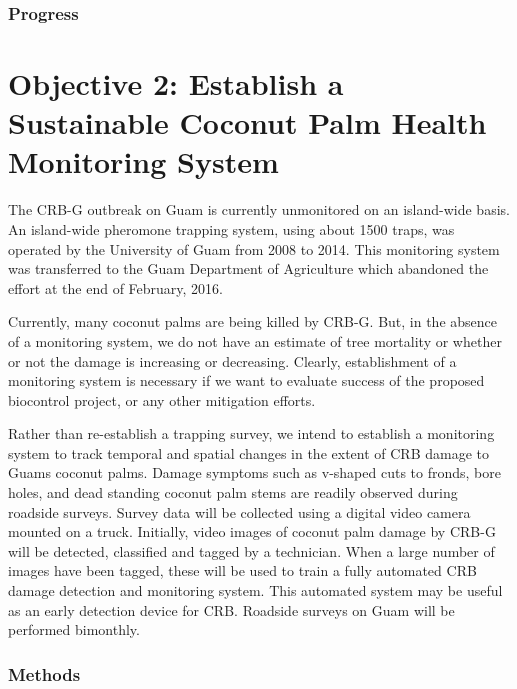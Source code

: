 \documentclass[12pt,letterpaper,english,bibliography=totocnumbered,abstract=on]{scrartcl}
\begin{document}
\subsubsection{Progress}


\section{Objective 2: Establish a Sustainable Coconut Palm Health Monitoring System}

The CRB-G outbreak on Guam is currently unmonitored on an island-wide basis. An island-wide pheromone trapping system, using about 1500 traps, was operated by the University of Guam from 2008 to 2014. This monitoring system was transferred to the Guam Department of Agriculture which abandoned the effort at the end of February, 2016.

Currently, many coconut palms are being killed by CRB-G. But, in the absence of a monitoring system, we do not have an estimate of tree mortality or whether or not the damage is increasing or decreasing. Clearly, establishment of a monitoring system is necessary if we want to evaluate success of the proposed biocontrol project, or any other mitigation efforts.

Rather than re-establish a trapping survey, we intend to establish a monitoring system to track temporal and spatial changes in the extent of CRB damage to Guams coconut palms. Damage symptoms such as v-shaped cuts to fronds, bore holes, and dead standing coconut palm stems are readily observed during roadside surveys. Survey data will be collected using a digital video camera mounted on a truck. Initially, video images of coconut palm damage by CRB-G will be detected, classified and tagged by a technician. When a large number of images have been tagged, these will be used to train a fully automated CRB damage detection and monitoring system. This automated system may be useful as an early detection device for CRB. Roadside surveys on Guam will be performed bimonthly.

\subsubsection{Methods}
\end{document}
